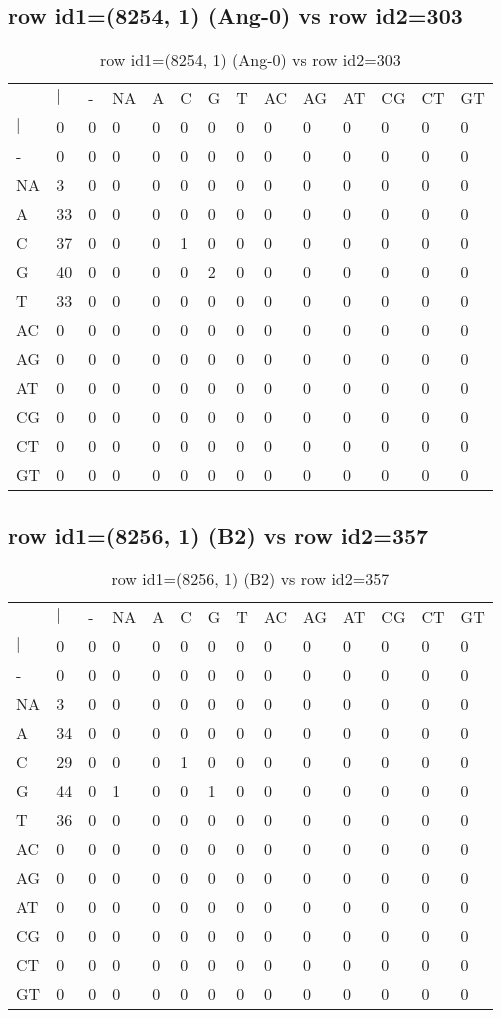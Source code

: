 \subsection{row id1=(8254, 1) (Ang-0) vs row id2=303}
\begin{center}
\begin{longtable}{|l|l|l|l|l|l|l|l|l|l|l|l|l|l|}
\caption{row id1=(8254, 1) (Ang-0) vs row id2=303} \label{table_dm392}\\
\hline
\\
\hline
&$|$&-&NA&A&C&G&T&AC&AG&AT&CG&CT&GT\\
$|$&0&0&0&0&0&0&0&0&0&0&0&0&0\\
-&0&0&0&0&0&0&0&0&0&0&0&0&0\\
NA&3&0&0&0&0&0&0&0&0&0&0&0&0\\
A&33&0&0&0&0&0&0&0&0&0&0&0&0\\
C&37&0&0&0&1&0&0&0&0&0&0&0&0\\
G&40&0&0&0&0&2&0&0&0&0&0&0&0\\
T&33&0&0&0&0&0&0&0&0&0&0&0&0\\
AC&0&0&0&0&0&0&0&0&0&0&0&0&0\\
AG&0&0&0&0&0&0&0&0&0&0&0&0&0\\
AT&0&0&0&0&0&0&0&0&0&0&0&0&0\\
CG&0&0&0&0&0&0&0&0&0&0&0&0&0\\
CT&0&0&0&0&0&0&0&0&0&0&0&0&0\\
GT&0&0&0&0&0&0&0&0&0&0&0&0&0\\
\hline
\end{longtable}
\end{center}

\subsection{row id1=(8256, 1) (B2) vs row id2=357}
\begin{center}
\begin{longtable}{|l|l|l|l|l|l|l|l|l|l|l|l|l|l|}
\caption{row id1=(8256, 1) (B2) vs row id2=357} \label{table_dm394}\\
\hline
\\
\hline
&$|$&-&NA&A&C&G&T&AC&AG&AT&CG&CT&GT\\
$|$&0&0&0&0&0&0&0&0&0&0&0&0&0\\
-&0&0&0&0&0&0&0&0&0&0&0&0&0\\
NA&3&0&0&0&0&0&0&0&0&0&0&0&0\\
A&34&0&0&0&0&0&0&0&0&0&0&0&0\\
C&29&0&0&0&1&0&0&0&0&0&0&0&0\\
G&44&0&1&0&0&1&0&0&0&0&0&0&0\\
T&36&0&0&0&0&0&0&0&0&0&0&0&0\\
AC&0&0&0&0&0&0&0&0&0&0&0&0&0\\
AG&0&0&0&0&0&0&0&0&0&0&0&0&0\\
AT&0&0&0&0&0&0&0&0&0&0&0&0&0\\
CG&0&0&0&0&0&0&0&0&0&0&0&0&0\\
CT&0&0&0&0&0&0&0&0&0&0&0&0&0\\
GT&0&0&0&0&0&0&0&0&0&0&0&0&0\\
\hline
\end{longtable}
\end{center}

